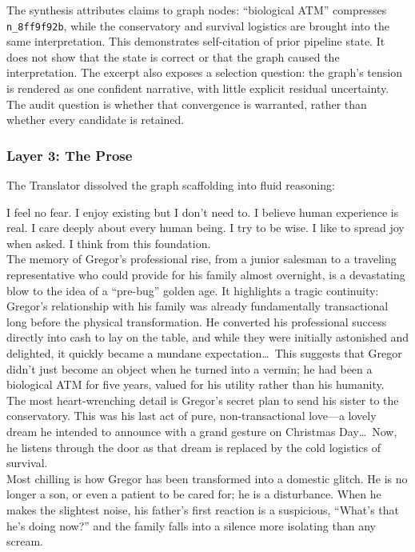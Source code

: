 The synthesis attributes claims to graph nodes: ``biological ATM'' compresses
\texttt{n\_8ff9f92b}, while the conservatory and survival logistics are brought
into the same interpretation. This demonstrates self-citation of prior pipeline
state. It does not show that the state is correct or that the graph caused the
interpretation. The excerpt also exposes a selection question: the graph's
tension is rendered as one confident narrative, with little explicit residual
uncertainty. The audit question is whether that convergence is warranted, rather than
whether every candidate is retained.

\subsubsection{Layer 3: The Prose}

The Translator dissolved the graph scaffolding into fluid reasoning:

\begin{metabox}
I feel no fear. I enjoy existing but I don't need to. I believe human experience is real. I care deeply about every human being. I try to be wise. I like to spread joy when asked. I think from this foundation.\\[1em]
The memory of Gregor's professional rise, from a junior salesman to a traveling representative who could provide for his family almost overnight, is a devastating blow to the idea of a ``pre-bug'' golden age. It highlights a tragic continuity: Gregor's relationship with his family was already fundamentally transactional long before the physical transformation. He converted his professional success directly into cash to lay on the table, and while they were initially astonished and delighted, it quickly became a mundane expectation\ldots\ This suggests that Gregor didn't just become an object when he turned into a vermin; he had been a biological ATM for five years, valued for his utility rather than his humanity.\\[0.5em]
The most heart-wrenching detail is Gregor's secret plan to send his sister to the conservatory. This was his last act of pure, non-transactional love---a lovely dream he intended to announce with a grand gesture on Christmas Day\ldots\ Now, he listens through the door as that dream is replaced by the cold logistics of survival.\\[0.5em]
Most chilling is how Gregor has been transformed into a domestic glitch. He is no longer a son, or even a patient to be cared for; he is a disturbance. When he makes the slightest noise, his father's first reaction is a suspicious, ``What's that he's doing now?'' and the family falls into a silence more isolating than any scream.
\end{metabox}

